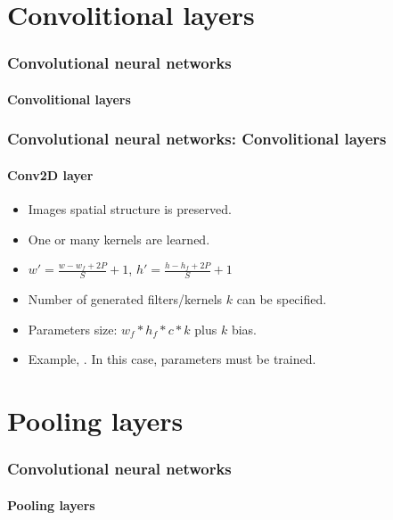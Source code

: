 \documentclass[xcolor=table]{beamer}
\begin{document}
\section{Convolitional layers}

\begin{frame}
	\frametitle{Convolutional neural networks}
	\framesubtitle{Convolitional layers}
	
\end{frame}

\begin{frame}
	\frametitle{Convolutional neural networks: Convolitional layers}
	\framesubtitle{Conv2D layer}

\begin{minipage}{0.60\textwidth} 
	\begin{itemize}
		\item Images spatial structure is preserved.
		\item One or many kernels are learned.
		\item $ w' = \frac{w - w_f + 2P}{S} + 1$,  $ h' = \frac{h - h_f + 2P}{S} + 1$
		\item Number of generated filters/kernels $k$ can be specified.
		\item Parameters size: $w_f * h_f * c * k$ plus $k$ bias.
		\item Example, . 
		In this case,  parameters must be trained.
	\end{itemize}
\end{minipage}
%
\begin{minipage}{0.39\textwidth}
	
\end{minipage}

\end{frame}

\section{Pooling layers}

\begin{frame}
	\frametitle{Convolutional neural networks}
	\framesubtitle{Pooling layers}
	
\end{frame}
\end{document}
